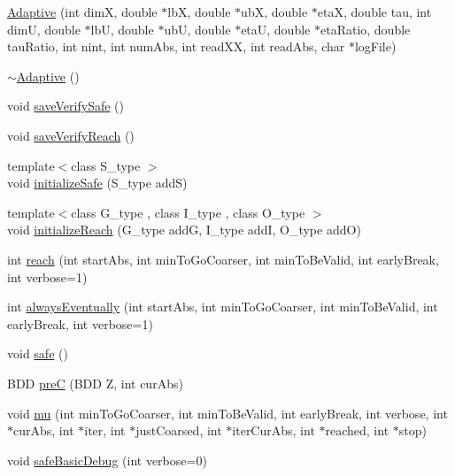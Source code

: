 \begin{DoxyCompactItemize}
\item 
\hyperlink{classscots_1_1Adaptive_a5665d4b8db7cc7c1e1ecba0a512959d7}{Adaptive} (int dimX, double $\ast$lbX, double $\ast$ubX, double $\ast$etaX, double tau, int dimU, double $\ast$lbU, double $\ast$ubU, double $\ast$etaU, double $\ast$eta\+Ratio, double tau\+Ratio, int nint, int num\+Abs, int read\+XX, int read\+Abs, char $\ast$log\+File)
\item 
\hyperlink{classscots_1_1Adaptive_aa20062d309691c2858912bc3fd9616e7}{$\sim$\+Adaptive} ()
\item 
void \hyperlink{classscots_1_1Adaptive_a629133566055e6445983b86082838b96}{save\+Verify\+Safe} ()
\item 
void \hyperlink{classscots_1_1Adaptive_aed48ef46c84bf6797bea16f896e44e3a}{save\+Verify\+Reach} ()
\item 
{\footnotesize template$<$class S\+\_\+type $>$ }\\void \hyperlink{classscots_1_1Adaptive_abb37f63b898de0d0013839d3b9d1db2f}{initialize\+Safe} (S\+\_\+type addS)
\item 
{\footnotesize template$<$class G\+\_\+type , class I\+\_\+type , class O\+\_\+type $>$ }\\void \hyperlink{classscots_1_1Adaptive_a63afb68f37f6140095c2460d07fc19cb}{initialize\+Reach} (G\+\_\+type addG, I\+\_\+type addI, O\+\_\+type addO)
\item 
int \hyperlink{classscots_1_1Adaptive_a94aa585894b725d174c1a33c938a11bf}{reach} (int start\+Abs, int min\+To\+Go\+Coarser, int min\+To\+Be\+Valid, int early\+Break, int verbose=1)
\item 
int \hyperlink{classscots_1_1Adaptive_aaf645bf4507f575426dfdd29de47dfe2}{always\+Eventually} (int start\+Abs, int min\+To\+Go\+Coarser, int min\+To\+Be\+Valid, int early\+Break, int verbose=1)
\item 
void \hyperlink{classscots_1_1Adaptive_a76d026d45bd794eba3ef69c18835dd54}{safe} ()
\item 
B\+DD \hyperlink{classscots_1_1Adaptive_a4a7b7cbccffbff31c135c9d5bd4d7ec0}{preC} (B\+DD Z, int cur\+Abs)
\item 
void \hyperlink{classscots_1_1Adaptive_a56ba7fb25e948dd1f2fa0c7380ca59e6}{mu} (int min\+To\+Go\+Coarser, int min\+To\+Be\+Valid, int early\+Break, int verbose, int $\ast$cur\+Abs, int $\ast$iter, int $\ast$just\+Coarsed, int $\ast$iter\+Cur\+Abs, int $\ast$reached, int $\ast$stop)
\item 
void \hyperlink{classscots_1_1Adaptive_a1c7b5c07621e61b846b70e949b92b0b7}{safe\+Basic\+Debug} (int verbose=0)

\end{DoxyCompactItemize}
